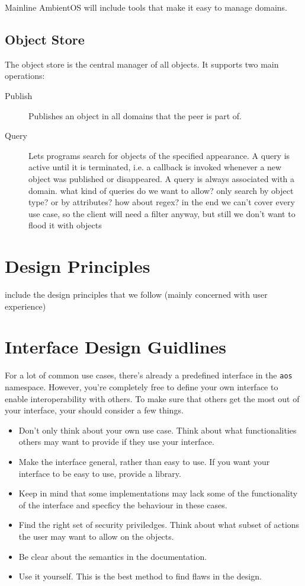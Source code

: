 \documentclass[a4paper]{article}
\begin{document}
Mainline AmbientOS will include tools that make it easy to manage domains.


\subsection{Object Store}
The object store is the central manager of all objects. It supports two main operations:

\begin{description}
  \item[Publish] Publishes an object in all domains that the peer is part of.
  \item[Query] Lets programs search for objects of the specified appearance. A query is active until it is terminated, i.e. a callback is invoked whenever a new object was published or disappeared. A query is always associated with a domain.
{\q what kind of queries do we want to allow? only search by object type? or by attributes? how about regex? in the end we can't cover every use case, so the client will need a filter anyway, but still we don't want to flood it with objects}
\end{description}


\section{Design Principles}

{\q include the design principles that we follow (mainly concerned with user experience)}


\section{Interface Design Guidlines} \label{sec:if-guide}

For a lot of common use cases, there's already a predefined interface in the {\tt aos} namespace. However, you're completely free to define your own interface to enable interoperability with others. To make sure that others get the most out of your interface, your should consider a few things.

\begin{itemize}
  \item Don't only think about your own use case. Think about what functionalities others may want to provide if they use your interface.
  \item Make the interface general, rather than easy to use. If you want your interface to be easy to use, provide a library.
  \item Keep in mind that some implementations may lack some of the functionality of the interface and specficy the behaviour in these cases.
  \item Find the right set of security priviledges. Think about what subset of actions the user may want to allow on the objects.
  \item Be clear about the semantics in the documentation.
  \item Use it yourself. This is the best method to find flaws in the design.
\end{itemize}
\end{document}
